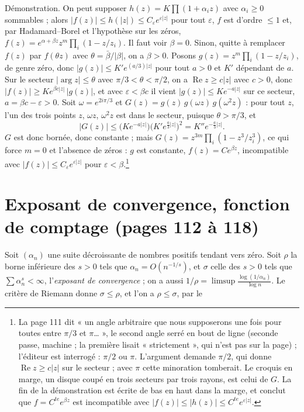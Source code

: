\documentclass[11pt,a4paper]{article}
\begin{document}
Démonstration. On peut supposer $h(z) = K\prod (1 + \alpha_i z)$ avec
$\alpha_i \geq 0$ sommables ; alors $|f(z)| \leq h(|z|) \leq C_\varepsilon
e^{\varepsilon |z|}$ pour tout $\varepsilon$, $f$ est d'ordre $\leq 1$ et,
par Hadamard--Borel et l'hypothèse sur les zéros, $f(z) = e^{\alpha + \beta
z} z^m \prod_i (1 - z/z_i)$. Il faut voir $\beta = 0$. Sinon, quitte à
remplacer $f(z)$ par $f(\theta z)$ avec $\theta = \bar\beta/|\beta|$, on a
$\beta > 0$. Posons $g(z) = z^m\prod_i (1 - z/z_i)$, de genre zéro, donc
$|g(z)| \leq K' e^{(a/3)|z|}$ pour tout $a > 0$ et $K'$ dépendant de $a$. Sur
le secteur $|\arg z| \leq \theta$ avec $\pi/3 < \theta < \pi/2$, on a
$\operatorname{Re} z \geq c|z|$ avec $c > 0$, donc $|f(z)| \geq K e^{\beta c
|z|}\,|g(z)|$, et avec $\varepsilon < \beta c$ il vient $|g(z)| \leq K
e^{-a|z|}$ sur ce secteur, $a = \beta c - \varepsilon > 0$. Soit $\omega =
e^{2i\pi/3}$ et $G(z) = g(z)\,g(\omega z)\,g(\omega^2 z)$ : pour tout $z$,
l'un des trois points $z$, $\omega z$, $\omega^2 z$ est dans le secteur,
puisque $\theta > \pi/3$, et
\[
  |G(z)| \leq \bigl(K e^{-a|z|}\bigr)\bigl(K' e^{\frac{a}{3}|z|}\bigr)^2
  = K'' e^{-\frac{a}{3}|z|} .
\]
$G$ est donc bornée, donc constante ; mais $G(z) = z^{3m}\prod_i (1 -
z^3/z_i^3)$, ce qui force $m = 0$ et l'absence de zéros : $g$ est constante,
$f(z) = Ce^{\beta z}$, incompatible avec $|f(z)| \leq C_\varepsilon
e^{\varepsilon|z|}$ pour $\varepsilon < \beta$.\footnote{La page 111 dit
« un angle arbitraire que nous supposerons une fois pour toutes entre
$\pi/3$ et $\pi$… », le second angle serré en bout de ligne (seconde passe,
machine ; la première lisait « strictement », qui n'est pas sur la page) ;
l'éditeur est interrogé : $\pi/2$ ou $\pi$. L'argument demande $\pi/2$, qui
donne $\operatorname{Re} z \geq c|z|$ sur le secteur ; avec $\pi$ cette
minoration tomberait. Le croquis en marge, un disque coupé en trois
secteurs par trois rayons, est celui de $G$. La fin de la démonstration
est écrite de bas en haut dans la marge, et conclut que $f = C^{te}e^{\beta
z}$ est incompatible avec $|f(z)| \leq |h(z)| \leq C^{te}e^{\varepsilon|z|}$.}

\section*{Exposant de convergence, fonction de comptage (pages 112 à 118)}

Soit $(\alpha_n)$ une suite décroissante de nombres positifs tendant vers
zéro. Soit $\rho$ la borne inférieure des $s > 0$ tels que $\alpha_n =
O(n^{-1/s})$, et $\sigma$ celle des $s > 0$ tels que $\sum \alpha_n^s <
\infty$, l'\emph{exposant de convergence} ; on a aussi $1/\rho = \limsup
\frac{\log(1/\alpha_n)}{\log n}$. Le critère de Riemann donne $\sigma \leq
\rho$, et l'on a $\rho \leq \sigma$, par le
\end{document}
